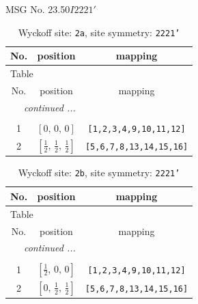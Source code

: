 \documentclass[fleqn,8pt]{jsarticle}
\begin{document}
\setcounter{MaxMatrixCols}{32}

\renewcommand{\tablename}{Table~}
\renewcommand{\figurename}{Figure~}
\begin{center}
\LARGE
MSG No. 23.50\quad$I2221'$
\end{center}
\renewcommand{\arraystretch}{1.2}
\begin{longtable}{ccc}
\caption{Wyckoff site: {\tt 2a}, site symmetry: {\tt 2221'}}
 \\
 \hline \hline
No. & position & mapping \\ \hline \endfirsthead

\multicolumn{2}{l}{\tablename\ \thetable{}} \\
 \hline \hline
No. & position & mapping \\ \hline \endhead

 \hline \hline
\multicolumn{2}{r}{\footnotesize\it continued ...} \\ \endfoot

 \hline \hline
\multicolumn{2}{r}{} \\ \endlastfoot

1 & $\left[ 0,\, 0,\, 0 \right]$ & {\tt [1,2,3,4,9,10,11,12]} \\ \hline
2 & $\left[ \frac{1}{2},\, \frac{1}{2},\, \frac{1}{2} \right]$ & {\tt [5,6,7,8,13,14,15,16]} \\
\end{longtable}
\renewcommand{\arraystretch}{1.2}
\begin{longtable}{ccc}
\caption{Wyckoff site: {\tt 2b}, site symmetry: {\tt 2221'}}
 \\
 \hline \hline
No. & position & mapping \\ \hline \endfirsthead

\multicolumn{2}{l}{\tablename\ \thetable{}} \\
 \hline \hline
No. & position & mapping \\ \hline \endhead

 \hline \hline
\multicolumn{2}{r}{\footnotesize\it continued ...} \\ \endfoot

 \hline \hline
\multicolumn{2}{r}{} \\ \endlastfoot

1 & $\left[ \frac{1}{2},\, 0,\, 0 \right]$ & {\tt [1,2,3,4,9,10,11,12]} \\ \hline
2 & $\left[ 0,\, \frac{1}{2},\, \frac{1}{2} \right]$ & {\tt [5,6,7,8,13,14,15,16]} \\
\end{longtable}
\end{document}
